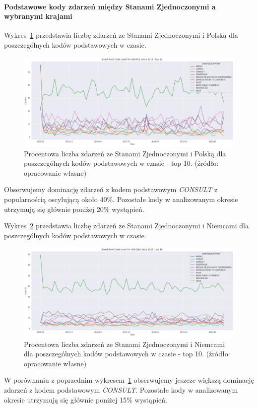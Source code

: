 \documentclass[11pt]{report}
\begin{document}
    \paragraph{Podstawowe kody zdarzeń między Stanami Zjednoczonymi a wybranymi krajami}

    Wykres~\ref{fig:USAPOLERC} przedstawia liczbę zdarzeń ze Stanami Zjednoczonymi i Polską dla poszczególnych kodów podstawowych w czasie.
    \begin{figure}[!htp]
        \centering
        \includegraphics[width=\linewidth]{fig/USA/USAPOLERCperc.png}
        \caption{Procentowa liczba zdarzeń ze Stanami Zjednoczonymi i Polską dla poszczególnych kodów podstawowych w czasie - top 10. (źródło: opracowanie własne)}
        \label{fig:USAPOLERC}
    \end{figure}
    Obserwujemy dominację zdarzeń z kodem podstawowym \textit{CONSULT} z popularnością oscylującą około 40\%.
    Pozostałe kody w analizowanym okresie utrzymują się głównie poniżej 20\% wystąpień.

    Wykres~\ref{fig:USADEUERC} przedstawia liczbę zdarzeń ze Stanami Zjednoczonymi i Niemcami dla poszczególnych kodów podstawowych w czasie.
    \begin{figure}[!htp]
        \centering
        \includegraphics[width=\linewidth]{fig/USA/USADEUERCperc.png}
        \caption{Procentowa liczba zdarzeń ze Stanami Zjednoczonymi i Niemcami dla poszczególnych kodów podstawowych w czasie - top 10. (źródło: opracowanie własne)}
        \label{fig:USADEUERC}
    \end{figure}
    W porównaniu z poprzednim wykresem~\ref{fig:USAPOLERC} obserwujemy jeszcze większą dominację zdarzeń z kodem podstawowym \textit{CONSULT}.
    Pozostałe kody w analizowanym okresie utrzymują się głównie poniżej 15\% wystąpień.
\end{document}
